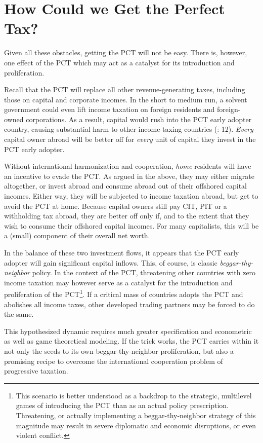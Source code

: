 \section[Prospects of the PCT]{How Could we Get the Perfect Tax?} \label{sec:HowToGetIt} Given all these obstacles, getting the PCT will not be easy. There is, however, one effect of the PCT which may act as a catalyst for its introduction and proliferation.

Recall that the PCT will replace all other revenue-generating taxes, including those on capital and corporate incomes. In the short to medium run, a solvent government could even lift income taxation on foreign residents and foreign-owned corporations. As a result, capital would rush into the PCT early adopter country, causing substantial harm to other income-taxing countries (\citealt{Dalsgaard2005}: 12). \emph{Every} capital owner abroad will be better off for \emph{every} unit of capital they invest in the PCT early adopter.

Without international harmonization and cooperation, \emph{home} residents will have an incentive to evade the PCT. As argued in the above, they may either migrate altogether, or invest abroad and consume abroad out of their offshored capital incomes. Either way, they will be subjected to income taxation abroad, but get to avoid the PCT at home. Because capital owners still pay CIT, PIT or a withholding tax abroad, they are better off only if, and to the extent that they wish to consume their offshored capital incomes. For many capitalists, this will be a (small) component of their overall net worth.

In the balance of these two investment flows, it appears that the PCT early adopter will gain significant capital inflows. This, of course, is classic \emph{beggar-thy-neighbor} policy. In the context of the PCT, threatening other countries with zero income taxation may however serve as a catalyst for the introduction and proliferation of the PCT\footnote{This scenario is better understood as a backdrop to the strategic, multilevel games of introducing the PCT than as an actual policy prescription. Threatening, or actually implementing a beggar-thy-neighbor strategy of this magnitude may result in severe diplomatic and economic disruptions, or even violent conflict.}. If a critical mass of countries adopts the PCT and abolishes all income taxes, other developed trading partners may be forced to do the same.

This hypothesized dynamic requires much greater specification and econometric as well as game theoretical modeling. If the trick works, the PCT carries within it not only the seeds to its own beggar-thy-neighbor proliferation, but also a promising recipe to overcome the international cooperation problem of progressive taxation.

